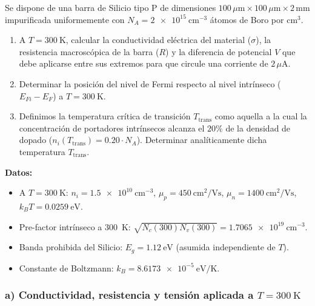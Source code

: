 \newpage
\begin{problema}
Se dispone de una barra de Silicio tipo P de dimensiones $100\,\mu\text{m} \times 100\,\mu\text{m} \times 2\,\text{mm}$ impurificada uniformemente con $N_A = \SI{2e15}{\cm^{-3}}$ átomos de Boro por $\text{cm}^3$.

\begin{enumerate}[label=\alph*)]
    \item A $T = \SI{300}{\kelvin}$, calcular la conductividad eléctrica del material ($\sigma$), la resistencia macroscópica de la barra ($R$) y la diferencia de potencial $V$ que debe aplicarse entre sus extremos para que circule una corriente de $2\,\mu\text{A}$.
    \item Determinar la posición del nivel de Fermi respecto al nivel intrínseco ($E_{Fi} - E_F$) a $T = \SI{300}{\kelvin}$.
    \item Definimos la temperatura crítica de transición $T_{\text{trans}}$ como aquella a la cual la concentración de portadores intrínsecos alcanza el $20\%$ de la densidad de dopado ($n_i(T_{\text{trans}}) = 0.20 \cdot N_A$). Determinar analíticamente dicha temperatura $T_{\text{trans}}$.
\end{enumerate}

\textbf{Datos:}
\begin{itemize}
    \item A $T = \SI{300}{\kelvin}$: $n_i = \SI{1.5e10}{\cm^{-3}}$, $\mu_p = \SI{450}{\cm^2/\V\second}$, $\mu_n = \SI{1400}{\cm^2/\V\second}$, $k_B T = \SI{0.0259}{\eV}$.
    \item Pre-factor intrínseco a \SI{300}{\kelvin}: $\sqrt{N_c(300) N_v(300)} = \SI{1.7065e19}{\cm^{-3}}$.
    \item Banda prohibida del Silicio: $E_g = \SI{1.12}{\eV}$ (asumida independiente de $T$).
    \item Constante de Boltzmann: $k_B = \SI{8.6173e-5}{\eV/\kelvin}$.
\end{itemize}

\tcblower

\subsubsection*{a) Conductividad, resistencia y tensión aplicada a $T = \SI{300}{\kelvin}$}


\end{problema}
